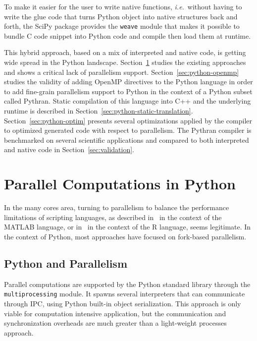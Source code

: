 \documentclass{llncs}
\begin{document}
To make it easier for the user to write native functions, \emph{i.e.}\ without
having to write the glue code that turns Python object into native structures
back and forth, the SciPy package provides the \texttt{weave} module that makes
it possible to bundle C code snippet into Python code and compile then load them
at runtime.

This hybrid approach, based on a mix of interpreted and native code, is getting
wide spread in the Python landscape. Section~\ref{sec:python-parallel} studies the
existing approaches and shows a critical lack of parallelism support.
Section~\ref{sec:python-openmp} studies the validity of adding OpenMP directives to the
Python language in order to add fine-grain parallelism support to Python in the
context of a Python subset called Pythran. Static compilation of this language
into C++ and the underlying runtime is described in
Section~\ref{sec:python-static-translation}.
Section~\ref{sec:python-optim} presents several optimizations applied by the compiler to
optimized generated code with respect to parallelism. The Pythran compiler is
benchmarked on several scientific applications and compared to both interpreted
and native code in Section~\ref{sec:validation}.

\section{Parallel Computations in Python}\label{sec:python-parallel}

In the many cores area, turning to parallelism to balance the performance
limitations of scripting languages, as described in~\cite{choy05} in the context
of the MATLAB language, or in~\cite{mals07} in the context of the R language,
seems legitimate. In the context of Python, most approaches have
focused on fork-based parallelism.

\subsection{Python and Parallelism}

Parallel computations are supported by the Python standard library through the
\texttt{multiprocessing} module. It spawns several interpreters that can
communicate through IPC, using Python built-in object serialization. This
approach is only viable for computation intensive application, but the
communication and synchronization overheads are much greater than a light-weight
processes approach.
\end{document}
